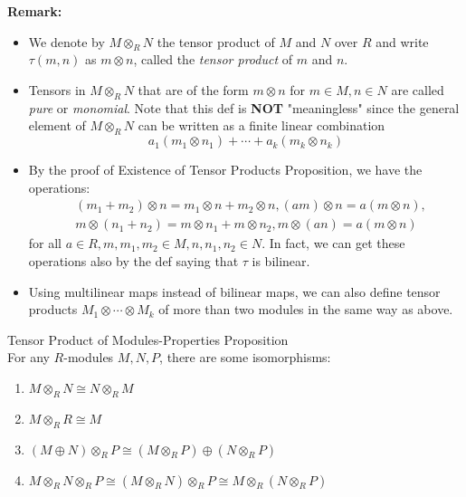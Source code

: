 \noindent\textbf{Remark:} \begin{itemize}
    \item We denote by $M \otimes_R N$ the tensor product of $M$ and $N$ over $R$ and write $\tau(m,n)$ as $m \otimes n$, called the \textit{tensor product} of $m$ and $n$.

    \item Tensors in $M\otimes _RN$ that are of the form $m\otimes n$ for $m\in M,n\in N$ are called \textit{pure} or \textit{monomial}. Note that this def is \textbf{NOT} "meaningless" since the general element of $M\otimes _RN$ can be written as a finite linear combination
    $$a_1 (m_1 \otimes n_1) +\cdots +a_k (m_k \otimes n_k)$$

    \item By the proof of Existence of Tensor Products Proposition, we have the operations:
    \begin{align*}
        &(m_1+m_2) \otimes n =m_1 \otimes n +m_2 \otimes n, (am) \otimes n = a(m \otimes n),\\
        &m \otimes (n_1+n_2) = m \otimes n_1 +m\otimes n_2, m\otimes (an)= a(m\otimes n)
    \end{align*}
    for all $a\in R,m,m_1,m_2\in M,n,n_1,n_2\in N$. In fact, we can get these operations also by the def saying that $\tau$ is bilinear.

    \item Using multilinear maps instead of bilinear maps, we can also define tensor products $M_1 \otimes \cdots \otimes M_k$ of more than two modules in the same way as above.
\end{itemize}

\begin{proposition}{Tensor Product of Modules-Properties Proposition}\\
For any $R$-modules $M,N,P$, there are some isomorphisms:
\begin{enumerate}
    \item $M \otimes_R N \cong N \otimes_R M$
    \item $M \otimes_R R \cong M$
    \item $(M \oplus N) \otimes_R P \cong (M \otimes _RP) \oplus (N \otimes _RP)$
    \item $M \otimes_RN \otimes _R P \cong (M \otimes_RN) \otimes _R P \cong M \otimes_R(N \otimes _R P)$
\end{enumerate}
\end{proposition}


